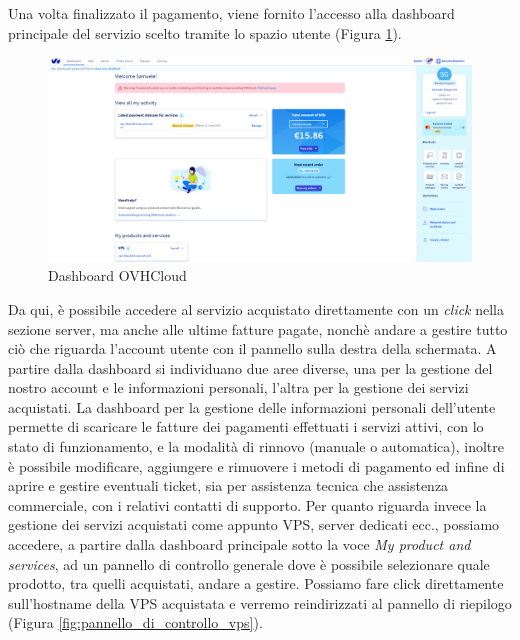 Una volta finalizzato il pagamento, viene fornito l'accesso alla dashboard principale del servizio scelto tramite lo spazio utente (Figura \ref{fig:dashboard_vps}).
\begin{figure}[ht]
	\centering
	\includegraphics[width=1\textwidth]{immagini/img9.png}
	\caption{Dashboard OVHCloud}
	\label{fig:dashboard_vps}
\end{figure}
Da qui, è possibile accedere al servizio acquistato direttamente con un \textit{click} nella sezione server, ma anche alle ultime fatture pagate, nonchè andare a gestire tutto ciò che riguarda l’account utente con il pannello sulla destra della schermata.
A partire dalla dashboard si individuano due aree diverse, una per la gestione del nostro account e le informazioni personali, l’altra per la gestione dei servizi acquistati. La dashboard per la gestione delle informazioni personali dell’utente permette di scaricare le fatture dei pagamenti effettuati i servizi attivi, con lo stato di funzionamento, e la modalità di rinnovo (manuale o automatica), inoltre è possibile modificare, aggiungere e rimuovere i metodi di pagamento ed infine di aprire e gestire eventuali ticket, sia per assistenza tecnica che assistenza commerciale, con i relativi contatti di supporto.
Per quanto riguarda invece la gestione dei servizi acquistati come appunto VPS, server dedicati ecc., possiamo accedere, a partire dalla dashboard principale sotto la voce \textit{My product and services}, ad un pannello di controllo generale dove è possibile selezionare quale prodotto, tra quelli acquistati, andare a gestire. Possiamo fare click direttamente sull’hostname della VPS acquistata e verremo reindirizzati al pannello di riepilogo (Figura \ref{fig:pannello_di_controllo_vps}).
